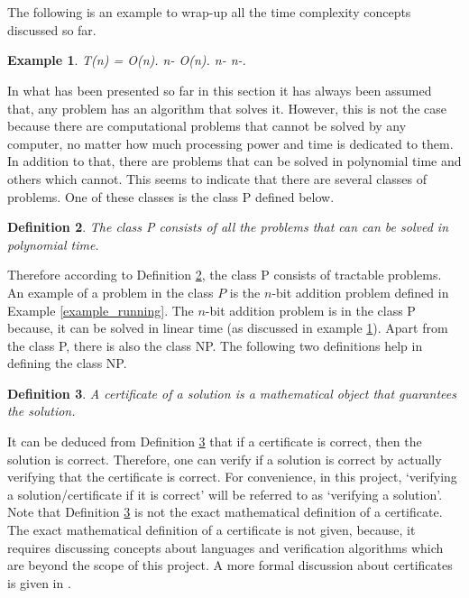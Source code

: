 \documentclass[12pt]{article}
\newtheorem{definition}{Definition}[subsection]
\newtheorem{example}[definition]{Example}
\numberwithin{equation}{subsection}
\numberwithin{table}{subsection}
\begin{document}
\\\\The following is an example to wrap-up all the time complexity concepts discussed so far.
\begin{example}
\label{time_complexity_example}
{} T(n) = O(n). {} n-{} O(n). {} n-{} n-{}.
\end{example}
In what has been presented so far in this section it has always been assumed that, any problem has an algorithm that solves it. However, this is not the case because there are computational problems that cannot be solved by any computer, no matter how much processing power and time is dedicated to them. In addition to that, there are problems that can be solved in polynomial time and others which cannot. This seems to indicate that there are several classes of problems. One of these classes is the class P defined below. \cite{cormen_leiserson_rivest_stein}
\begin{definition}
\label{P}
The class P consists of all the problems that can can be solved in polynomial time. {}
\end{definition}
Therefore according to Definition \ref{P}, the class P consists of tractable problems. An example of a problem in the class $\mathit{P}$ is the $\mathit{n}$-bit addition problem defined in Example \ref{example_running}. The $\mathit{n}$-bit addition problem is in the class P because, it can be solved in linear time (as discussed in example \ref{time_complexity_example}). Apart from the class P, there is also the class NP. The following two definitions help in defining the class NP.
\begin{definition}
\label{certificate}
A certificate of a solution is a mathematical object that guarantees the solution. {}
\end{definition}
It can be deduced from Definition \ref{certificate} that if a certificate is correct, then the solution is correct. Therefore, one can verify if a solution is correct by actually verifying that the certificate is correct. For convenience, in this project, `verifying a solution/certificate if it is correct' will be referred to as `verifying a solution'. Note that Definition \ref{certificate} is not the exact mathematical definition of a certificate. The exact mathematical definition of a certificate is not given, because, it requires discussing concepts about languages and verification algorithms which are beyond the scope of this project. A more formal discussion about certificates is given in \cite{cormen_leiserson_rivest_stein}.
\end{document}
